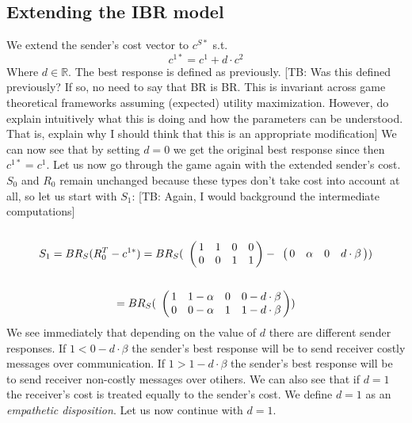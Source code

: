 \documentclass[10pt]{article}
\newcommand{\tb}[1]{\textcolor[rgb]{.8,.33,.0}{[TB: #1]}}%
\begin{document}
\subsection{Extending the IBR model}
We extend the sender's cost vector to $c^{S*}$ s.t. %
$$c^{1*}=c^{1} + d \cdot c^{2}$$
Where $d \in \mathbb{R}$. The best response is defined as previously. \tb{Was this defined previously? If so, no need to say that BR is BR. This is invariant across game theoretical frameworks assuming (expected) utility maximization. However, do explain intuitively what this is doing and how the parameters can be understood. That is, explain why I should think that this is an appropriate modification}
We can now see that by setting $d=0$ we get the original best response since then $c^{1*}=c^{1}$.
Let us now go through the game again with the extended sender's cost. $S_0$ and $R_0$ remain unchanged because these types don't take cost into account at all, so let us start with $S_1$: \tb{Again, I would background the intermediate computations}
\begin{equation*}
S_1= BR_S(R_0^T-c^{1*})=
BR_S(
\bordermatrix{
            & & & &    \cr
 &       1 &         1 & 0       & 0 \cr
 &       0 &         0 & 1      & 1
 }
-
\bordermatrix{
            & & & &    \cr
 &       0 &         \alpha & 0       & d \cdot \beta \cr
 }
)
\end{equation*}
\begin{equation*}
=BR_S(
\bordermatrix{
                & & & &    \cr
     &       1 &         1-\alpha & 0       & 0-d\cdot \beta \cr
     &       0 &         0-\alpha & 1      & 1-d\cdot \beta
 }
 )
 \end{equation*}
We see immediately that depending on the value of $d$ there are different sender responses. If $1<0-d\cdot \beta$ the sender's best response will be to send receiver costly messages over communication.  If $1>1-d\cdot \beta$ the sender's best response will be to send receiver non-costly messages over otihers. We can also see that if $d=1$ the receiver's cost is treated equally to the sender's cost. We define $d=1$ as an \textit{empathetic disposition}. Let us now continue with $d=1$.
\end{document}
